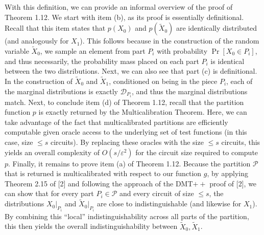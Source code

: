 \documentclass[10pt,a4paper]{article}
\begin{document}



With this definition, we can provide an informal overview of the proof of Theorem 1.12.
We start with item (b), as its proof is essentially definitional. Recall that this item states that $p(X_{0})$ and $p(\widetilde{X}_{0})$ are identically distributed (and analogously for $X_{1}$). This follows because in the construction of the random variable $\widetilde{X}_{0}$, we sample an element from part $P_{i}$ with probability $\Pr[X_{0}\in P_{i}]$, and thus necessarily, the probability mass placed on each part $P_{i}$ is identical between the two distributions. Next, we can also see that part (c) is definitional. In the construction of $\widetilde{X}_{0}$ and $\widetilde{X}_{1}$, conditioned on being in the piece $P_{i}$, each of the marginal distributions is exactly $\mathcal{D}_{P_{i}}$, and thus the marginal distributions match.
Next, to conclude item (d) of Theorem 1.12, recall that the partition function $p$ is exactly returned by the Multicalibration Theorem. Here, we can take advantage of the fact that multicalibrated partitions are efficiently computable given oracle access to the underlying set of test functions (in this case, size $\leq s$ circuits). By replacing these oracles with the size $\leq s$ circuits, this yields an overall complexity of $O(s/\varepsilon^{2})$ for the circuit size required to compute $p$.
Finally, it remains to prove item (a) of Theorem 1.12. Because the partition $\mathcal{P}$ that is returned is multicalibrated with respect to our function $g$, by applying Theorem 2.15 of [2] and following the approach of the DMT$++$ proof of [2], we can show that for every part $P_{i}\in\mathcal{P}$ and every circuit of size $\leq s$, the distributions $X_{0}|_{P_{i}}$ and $\widetilde{X}_{0}|_{P_{i}}$ are close to indistinguishable (and likewise for $X_{1}$). By combining this “local” indistinguishability across all parts of the partition, this then yields the overall indistinguishability between $\widetilde{X}_{0},\widetilde{X}_{1}$.\par
\end{document}
